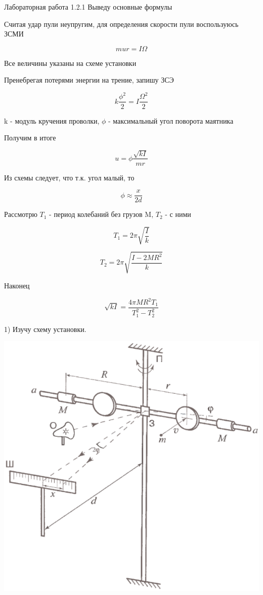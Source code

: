 \documentclass{astroedu-lab}
\begin{document}
\begin{problem}{\large Лабораторная работа 1.2.1}
Выведу основные формулы

Считая удар пули неупругим, для определения скорости пули воспользуюсь ЗСМИ

\begin{equation}
	m u r = I \Omega
\end{equation}

Все величины указаны на схеме установки

Пренебрегая потерями энергии на трение, запишу ЗСЭ

\begin{equation}
	k \frac{\phi^2}{2} = I \frac{\Omega^2}{2}
\end{equation}

k - модуль кручения проволки, $\phi$ - максимальный угол поворота маятника

Получим в итоге

\[
\boxed{u = \phi \frac{\sqrt{k I}}{m r}}
\]

Из схемы следует, что т.к. угол малый, то

\begin{equation}
	\phi \approx \frac{x}{2 d}
\end{equation}

Рассмотрю $T_1$ - период колебаний без грузов M, $T_2$ - с ними

\begin{equation}
	T_1 = 2 \pi \sqrt{\frac{I}{k}}
\end{equation}

\begin{equation}
	T_2 = 2 \pi \sqrt{\frac{I - 2 M R^2}{k}}
\end{equation}

Наконец

\[
\boxed{\sqrt{k I} = \frac{4 \pi M R^2 T_1}{T_1^2 - T_2^2}}
\]

\newpage

1) Изучу схему установки.

\begin{center}

\includegraphics[width=0.6\linewidth]{pic_2.png}


\end{center}
\end{problem}
\end{document}
